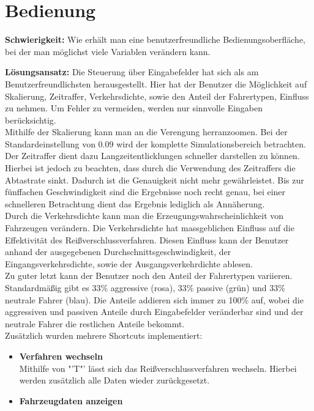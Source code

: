 \section{Bedienung}
\textbf{Schwierigkeit:} Wie erhält man eine benutzerfreundliche Bedienungsoberfläche, bei der man möglichst viele Variablen verändern kann.
\begin{addmargin}[25pt]{0pt}
	\item \textbf{Lösungsansatz:} Die Steuerung über Eingabefelder hat sich als am Benutzerfreundlichsten herausgestellt. Hier hat der Benutzer die Möglichkeit auf Skalierung, Zeitraffer, Verkehrsdichte, sowie den Anteil der Fahrertypen, Einfluss zu nehmen. Um Fehler zu vermeiden, werden nur sinnvolle Eingaben berücksichtig.\\ 
	Mithilfe der Skalierung kann man an die Verengung herranzoomen. Bei der Standardeinstellung von 0.09 wird der komplette Simulationsbereich betrachten.\\ 
	Der Zeitraffer dient dazu Langzeitentlicklungen schneller darstellen zu können. Hierbei ist jedoch zu beachten, dass durch die Verwendung des Zeitraffers die Abtastrate sinkt. Dadurch ist die Genauigkeit nicht mehr gewährleistet. Bis zur fünffachen Geschwindigkeit sind die Ergebnisse noch recht genau, bei einer schnelleren Betrachtung dient das Ergebnis lediglich als Annäherung.\\
	Durch die Verkehrsdichte kann man die Erzeugungswahrscheinlichkeit von Fahrzeugen verändern. Die Verkehrsdichte hat massgeblichen Einfluss auf die Effektivität des Reißverschlussverfahren. Diesen Einfluss kann der Benutzer anhand der ausgegebenen Durchschnittsgeschwindigkeit, der Eingangsverkehrsdichte, sowie der Ausgangsverkehrdichte ablesen.\\
	Zu guter letzt kann der Benutzer noch den Anteil der Fahrertypen variieren. Standardmäßig gibt es 33\% aggressive (rosa), 33\% passive (grün) und 33\% neutrale Fahrer (blau). Die Anteile addieren sich immer zu 100\% auf, wobei die aggressiven und passiven Anteile durch Eingabefelder veränderbar sind und der neutrale Fahrer die restlichen Anteile bekommt.\\
	Zusätzlich wurden mehrere Shortcuts implementiert:
	\begin{itemize}
		\item \textbf{Verfahren wechseln}\\
		Mithilfe von "'T"' lässt sich das Reißverschlussverfahren wechseln. Hierbei werden zusätzlich alle Daten wieder zurückgesetzt.
		\item \textbf{Fahrzeugdaten anzeigen}\\

\end{itemize}
\end{addmargin}
